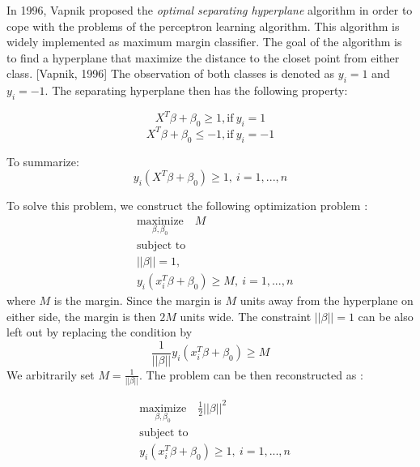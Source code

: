 In 1996, Vapnik proposed the \emph{optimal separating hyperplane} algorithm in order to cope with the problems of the perceptron learning algorithm.
This algorithm is widely implemented as maximum margin classifier.
The goal of the algorithm is to find a hyperplane that maximize the distance to the closet point from either class. [Vapnik, 1996]
The observation of both classes is denoted as $y_i = 1$ and $y_i = -1$. The separating hyperplane then has the following property:

\begin{equation}
    X^T \beta + \beta_0 \geq 1, \text{if}\ y_i = 1
\end{equation}
\begin{equation}
    X^T \beta + \beta_0 \leq -1, \text{if}\ y_i = -1
\end{equation}

To summarize:
\begin{equation}
    y_i(X^T \beta + \beta_0) \geq 1,\ i = 1, ..., n
\end{equation}

To solve this problem, we construct the following optimization problem \cite{R9}:
\begin{equation}
    \begin{aligned}
      & \underset{\textstyle {\beta, \beta_0}}{\text{maximize}} \quad
        M \\
      & \text{subject to} \\
      & ||\beta|| = 1, \\
      & y_i(x_i^T \beta + \beta_0) \geq M,\ i = 1, ..., n
    \end{aligned}
\end{equation}
where $M$ is the margin. Since the margin is $M$ units away from the hyperplane on either side,
the margin is then $2M$ units wide. The constraint $||\beta|| = 1$ can be also left out by replacing
the condition by
\begin{equation}
    \frac{1}{||\beta||}y_i(x_i^T \beta + \beta_0) \geq M
\end{equation}
We arbitrarily set $M = \frac{1}{||\beta||}$. The problem can be then reconstructed as \cite{Elements4}:

\begin{equation}
    \begin{aligned}
      & \underset{\textstyle {\beta, \beta_0}}{\text{maximize}} \quad
        \frac12 ||\beta||^2 \\
      & \text{subject to} \\
      & y_i(x_i^T \beta + \beta_0) \geq 1,\ i = 1, ..., n
    \end{aligned}
\end{equation}

